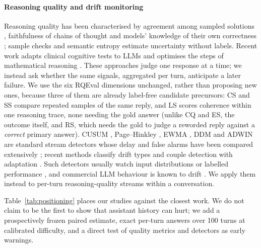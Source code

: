 \paragraph{Reasoning quality and drift monitoring}
Reasoning quality has been characterised by agreement among sampled solutions
\citep{wang2023selfconsistency}, faithfulness of chains of thought
\citep{wei2022chain,turpin2023say,lanham2023measuring} and models' knowledge of
their own correctness \citep{kadavath2022know}; sample checks
\citep{manakul2023selfcheckgpt} and semantic entropy
\citep{farquhar2024detecting} estimate uncertainty without labels. Recent work
adapts clinical cognitive tests to LLMs \citep{park2027lmmse} and optimises the
steps of mathematical reasoning \citep{lee2026fgrpo}. These approaches judge one
response at a time; we instead ask whether the same signals, aggregated per
turn, anticipate a later failure. We use the six RQEval dimensions
\citep{rqeval2026} unchanged, rather than proposing new ones, because three of
them are already label-free candidate precursors: CS and SS compare repeated
samples of the same reply, and LS scores coherence within one reasoning trace,
none needing the gold answer (unlike CQ and ES, the outcome itself, and RS,
which needs the gold to judge a reworded reply against a \emph{correct}
primary answer). CUSUM
\citep{page1954continuous}, Page--Hinkley
\citep{hinkley1971inference}, EWMA \citep{roberts1959control}, DDM
\citep{gama2004learning} and ADWIN \citep{bifet2007learning} are standard
stream detectors whose delay and false alarms have been compared extensively
\citep{gama2014survey,webb2016characterizing,goncalves2014comparative,barros2018largescale,bayram2022concept};
recent methods classify drift types \citep{deng2025zilean} and couple
detection with adaptation \citep{abushaira2027sccm}. Such detectors usually
watch input distributions or labelled performance
\citep{sculley2015hidden,rabanser2019failing}, and commercial LLM behaviour is
known to drift \citep{chen2024chatgpt}. We apply them instead to per-turn
reasoning-quality streams within a conversation.

Table~\ref{tab:positioning} places our studies against the closest work. We do
not claim to be the first to show that assistant history can hurt; we add a
prospectively frozen paired estimate, exact per-turn answers over 100 turns at
calibrated difficulty, and a direct test of quality metrics and detectors as
early warnings.

